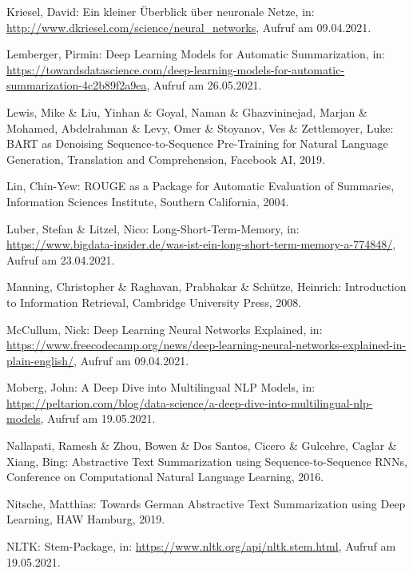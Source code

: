 \begin{thebibliography}{116}
Kriesel, David: Ein kleiner Überblick über neuronale Netze, in: \url{http://www.dkriesel.com/science/neural_networks}, Aufruf am 09.04.2021.

Lemberger, Pirmin: Deep Learning Models for Automatic Summarization, in: \url{https://towardsdatascience.com/deep-learning-models-for-automatic-summarization-4c2b89f2a9ea}, Aufruf am 26.05.2021.

Lewis, Mike \& Liu, Yinhan \& Goyal, Naman \& Ghazvininejad, Marjan \& Mohamed, Abdelrahman \& Levy, Omer \& Stoyanov, Ves \& Zettlemoyer, Luke: BART as Denoising Sequence-to-Sequence Pre-Training for Natural
Language Generation, Translation and Comprehension, Facebook AI, 2019.

Lin, Chin-Yew: ROUGE as a Package for Automatic Evaluation of Summaries, Information Sciences Institute, Southern California, 2004.

Luber, Stefan \& Litzel, Nico: Long-Short-Term-Memory, in: \url{https://www.bigdata-insider.de/was-ist-ein-long-short-term-memory-a-774848/}, Aufruf am 23.04.2021.

Manning, Christopher \& Raghavan, Prabhakar \& Schütze, Heinrich: Introduction to Information Retrieval, Cambridge University Press, 2008.

McCullum, Nick: Deep Learning Neural Networks Explained, in: \url{https://www.freecodecamp.org/news/deep-learning-neural-networks-explained-in-plain-english/}, Aufruf am 09.04.2021.

Moberg, John: A Deep Dive into Multilingual NLP Models, in: \url{https://peltarion.com/blog/data-science/a-deep-dive-into-multilingual-nlp-models}, Aufruf am 19.05.2021.

Nallapati, Ramesh \& Zhou, Bowen \& Dos Santos, Cicero \& Gulcehre, Caglar \& Xiang, Bing: Abstractive Text Summarization using Sequence-to-Sequence RNNs, Conference on Computational Natural Language Learning, 2016.

Nitsche, Matthias: Towards German Abstractive Text Summarization using Deep Learning, HAW Hamburg, 2019.

NLTK: Stem-Package, in: \url{https://www.nltk.org/api/nltk.stem.html}, Aufruf am 19.05.2021.


\end{thebibliography}
